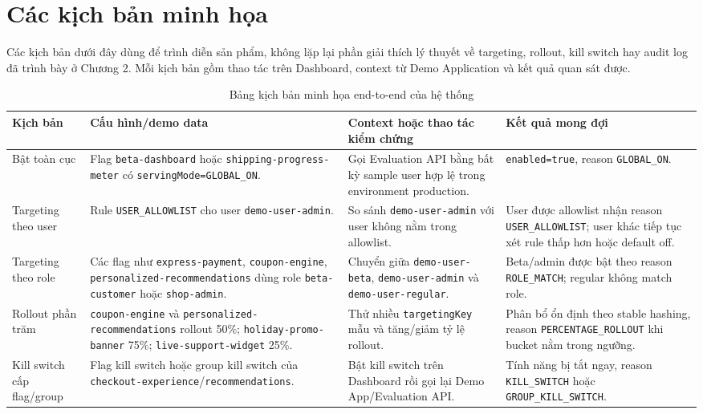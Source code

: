 \section{Các kịch bản minh họa}

Các kịch bản dưới đây dùng để trình diễn sản phẩm, không lặp lại phần giải thích lý thuyết về targeting, rollout, kill switch hay audit log đã trình bày ở Chương 2. Mỗi kịch bản gồm thao tác trên Dashboard, context từ Demo Application và kết quả quan sát được.

\begin{table}[H]
    \centering
    \small
    \caption{Bảng kịch bản minh họa end-to-end của hệ thống}
    \label{tab:demo-scenario-evidence}
    \begin{tabular}{p{} p{} p{} p{}}
        \toprule
        \textbf{Kịch bản} & \textbf{Cấu hình/demo data} & \textbf{Context hoặc thao tác kiểm chứng} & \textbf{Kết quả mong đợi} \\
        \midrule
        Bật toàn cục & Flag \texttt{beta-dashboard} hoặc \texttt{shipping-progress-meter} có \texttt{servingMode=GLOBAL\_ON}. & Gọi Evaluation API bằng bất kỳ sample user hợp lệ trong environment production. & \texttt{enabled=true}, reason \texttt{GLOBAL\_ON}. \\
        Targeting theo user & Rule \texttt{USER\_ALLOWLIST} cho user \texttt{demo-user-admin}. & So sánh \texttt{demo-user-admin} với user không nằm trong allowlist. & User được allowlist nhận reason \texttt{USER\_ALLOWLIST}; user khác tiếp tục xét rule thấp hơn hoặc default off. \\
        Targeting theo role & Các flag như \texttt{express-payment}, \texttt{coupon-engine}, \texttt{personalized-recommendations} dùng role \texttt{beta-customer} hoặc \texttt{shop-admin}. & Chuyển giữa \texttt{demo-user-beta}, \texttt{demo-user-admin} và \texttt{demo-user-regular}. & Beta/admin được bật theo reason \texttt{ROLE\_MATCH}; regular không match role. \\
        Rollout phần trăm & \texttt{coupon-engine} và \texttt{personalized-recommendations} rollout 50\%; \texttt{holiday-promo-banner} 75\%; \texttt{live-support-widget} 25\%. & Thử nhiều \texttt{targetingKey} mẫu và tăng/giảm tỷ lệ rollout. & Phân bổ ổn định theo stable hashing, reason \texttt{PERCENTAGE\_ROLLOUT} khi bucket nằm trong ngưỡng. \\
        Kill switch cấp flag/group & Flag kill switch hoặc group kill switch của \texttt{checkout-experience}/\texttt{recommendations}. & Bật kill switch trên Dashboard rồi gọi lại Demo App/Evaluation API. & Tính năng bị tắt ngay, reason \texttt{KILL\_SWITCH} hoặc \texttt{GROUP\_KILL\_SWITCH}. \\

\end{tabular}
\end{table}
